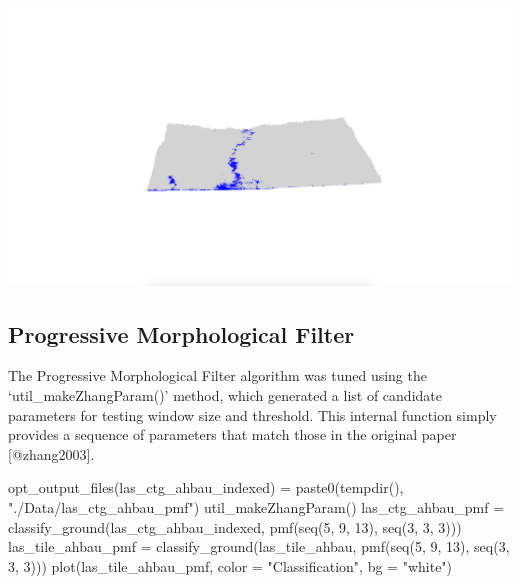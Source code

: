 \documentclass[
]{article}
\newenvironment{Shaded}{\begin{snugshade}}{\end{snugshade}}
\newcommand{\AttributeTok}[1]{\textcolor[rgb]{0.77,0.63,0.00}{#1}}
\newcommand{\DecValTok}[1]{\textcolor[rgb]{0.00,0.00,0.81}{#1}}
\newcommand{\FunctionTok}[1]{\textcolor[rgb]{0.00,0.00,0.00}{#1}}
\newcommand{\NormalTok}[1]{#1}
\newcommand{\OtherTok}[1]{\textcolor[rgb]{0.56,0.35,0.01}{#1}}
\newcommand{\StringTok}[1]{\textcolor[rgb]{0.31,0.60,0.02}{#1}}
\begin{document}
\includegraphics{13_lidR_PointCloud_Processing_files/markdown_pngs/las_tile_ahbau_csf.png}

\hypertarget{progressive-morphological-filter}{%
\subsection{Progressive Morphological
Filter}\label{progressive-morphological-filter}}

The Progressive Morphological Filter algorithm was tuned using the
`util\_makeZhangParam()' method, which generated a list of candidate
parameters for testing window size and threshold. This internal function
simply provides a sequence of parameters that match those in the
original paper {[}@zhang2003{]}.

\begin{Shaded}
\begin{Highlighting}[]
\FunctionTok{opt\_output\_files}\NormalTok{(las\_ctg\_ahbau\_indexed) }\OtherTok{=}  \FunctionTok{paste0}\NormalTok{(}\FunctionTok{tempdir}\NormalTok{(), }\StringTok{"./Data/las\_ctg\_ahbau\_pmf"}\NormalTok{)}
\FunctionTok{util\_makeZhangParam}\NormalTok{()}
\NormalTok{las\_ctg\_ahbau\_pmf }\OtherTok{=} \FunctionTok{classify\_ground}\NormalTok{(las\_ctg\_ahbau\_indexed, }\FunctionTok{pmf}\NormalTok{(}\FunctionTok{seq}\NormalTok{(}\DecValTok{5}\NormalTok{, }\DecValTok{9}\NormalTok{, }\DecValTok{13}\NormalTok{), }\FunctionTok{seq}\NormalTok{(}\DecValTok{3}\NormalTok{, }\DecValTok{3}\NormalTok{, }\DecValTok{3}\NormalTok{)))}
\NormalTok{las\_tile\_ahbau\_pmf }\OtherTok{=} \FunctionTok{classify\_ground}\NormalTok{(las\_tile\_ahbau, }\FunctionTok{pmf}\NormalTok{(}\FunctionTok{seq}\NormalTok{(}\DecValTok{5}\NormalTok{, }\DecValTok{9}\NormalTok{, }\DecValTok{13}\NormalTok{), }\FunctionTok{seq}\NormalTok{(}\DecValTok{3}\NormalTok{, }\DecValTok{3}\NormalTok{, }\DecValTok{3}\NormalTok{)))}
\FunctionTok{plot}\NormalTok{(las\_tile\_ahbau\_pmf, }\AttributeTok{color =} \StringTok{"Classification"}\NormalTok{, }\AttributeTok{bg =} \StringTok{"white"}\NormalTok{) }
\end{Highlighting}
\end{Shaded}
\end{document}
